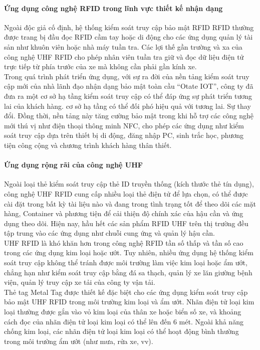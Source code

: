 \paragraph{Ứng dụng công nghệ RFID trong lĩnh vực thiết kế nhận dạng}
Ngoài độc giả cố định, hệ thống kiểm soát truy cập bảo mật RFID RFID thường được trang bị đầu đọc RFID cầm tay hoặc di động cho các ứng dụng quản lý tài sản như khuôn viên hoặc nhà máy tuần tra. Các lợi thế gần trường và xa của công nghệ UHF RFID cho phép nhân viên tuần tra giữ và đọc dữ liệu điện tử trực tiếp từ phía trước của xe mà không cần phải gần kính xe.\\
Trong quá trình phát triển ứng dụng, với sự ra đời của nền tảng kiểm soát truy cập mới của nhà lãnh đạo nhận dạng bảo mật toàn cầu “Otate IOT”, công ty đã đưa ra một cơ sở hạ tầng kiểm soát truy cập có thể đáp ứng sự phát triển tương lai của khách hàng. cơ sở hạ tầng có thể đối phó hiệu quả với tương lai. Sự thay đổi. Đồng thời, nền tảng này tăng cường bảo mật trong khi hỗ trợ các công nghệ mới thú vị như điện thoại thông minh NFC, cho phép các ứng dụng như kiểm soát truy cập dựa trên thiết bị di động, đăng nhập PC, sinh trắc học, phương tiện công cộng và chương trình khách hàng thân thiết.
\paragraph{Ứng dụng rộng rãi của công nghệ UHF}
Ngoài loại thẻ kiểm soát truy cập thẻ ID truyền thống (kích thước thẻ tín dụng), công nghệ UHF RFID cung cấp nhiều loại thẻ điện tử để lựa chọn, có thể được cài đặt trong bất kỳ tài liệu nào và đang trong tình trạng tốt để theo dõi các mặt hàng, Container và phương tiện để cải thiện độ chính xác của hậu cần và ứng dụng theo dõi. Hiện nay, hầu hết các sản phẩm RFID UHF trên thị trường đều tập trung vào các ứng dụng như chuỗi cung ứng và quản lý hậu cần.\\
UHF RFID là khó khăn hơn trong công nghệ RFID tần số thấp và tần số cao trong các ứng dụng kim loại hoặc ướt. Tuy nhiên, nhiều ứng dụng hệ thống kiểm soát truy cập không thể tránh được môi trường làm việc kim loại hoặc ẩm ướt, chẳng hạn như kiểm soát truy cập bằng đá sa thạch, quản lý xe lăn giường bệnh viện, quản lý truy cập xe tải của công ty vận tải.\\
Thẻ tag Metal Tag được thiết kế đặc biệt cho các ứng dụng kiểm soát truy cập bảo mật UHF RFID trong môi trường kim loại và ẩm ướt. Nhãn điện tử loại kim loại thường được gắn vào vỏ kim loại của thân xe hoặc biển số xe, và khoảng cách đọc của nhãn điện tử loại kim loại có thể lên đến 6 mét. Ngoài khả năng chống kim loại, các nhãn điện tử loại kim loại có thể hoạt động bình thường trong môi trường ẩm ướt (như mưa, rửa xe, vv).


